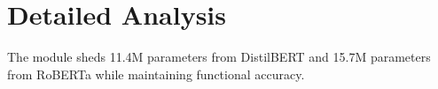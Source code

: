 \section{Detailed Analysis}The module sheds 11.4M parameters from DistilBERT and 15.7M parameters from RoBERTa while maintaining functional accuracy.
